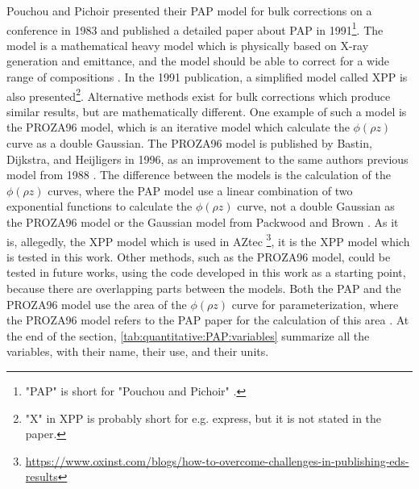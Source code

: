 Pouchou and Pichoir presented their PAP model for bulk corrections on a conference in 1983 and published a detailed paper about PAP in 1991\footnote{"PAP" is short for "Pouchou and Pichoir" \cite{pap_1991}.}.
The model is a mathematical heavy model which is physically based on X-ray generation and emittance, and the model should be able to correct for a wide range of compositions \cite{pap_1991}.
In the 1991 publication, a simplified model called XPP is also presented\footnote{"X" in XPP is probably short for e.g. express, but it is not stated in the paper.}.
Alternative methods exist for bulk corrections which produce similar results, but are mathematically different.
One example of such a model is the PROZA96 model, which is an iterative model which calculate the $\phi(\rho z)$ curve as a double Gaussian.
The PROZA96 model is published by Bastin, Dijkstra, and Heijligers in 1996, as an improvement to the same authors previous model from 1988 \cite{bastin_proza96_1998,bastin_proza_1988}.
The difference between the models is the calculation of the $\phi(\rho z)$ curves, where the PAP model use a linear combination of two exponential functions to calculate the $\phi(\rho z)$ curve, not a double Gaussian as the PROZA96 model or the Gaussian model from Packwood and Brown \cite{packwood_1981}.
As it is, allegedly, the XPP model which is used in AZtec \cite{} \footnote{\url{https://www.oxinst.com/blogs/how-to-overcome-challenges-in-publishing-eds-results}}, it is the XPP model which is tested in this work.
Other methods, such as the PROZA96 model, could be tested in future works, using the code developed in this work as a starting point, because there are overlapping parts between the models.
Both the PAP and the PROZA96 model use the area of the $\phi(\rho z)$ curve for parameterization, where the PROZA96 model refers to the PAP paper for the calculation of this area \cite{bastin_proza96_1998}.
At the end of the section, \cref{tab:quantitative:PAP:variables} summarize all the variables, with their name, their use, and their units.







